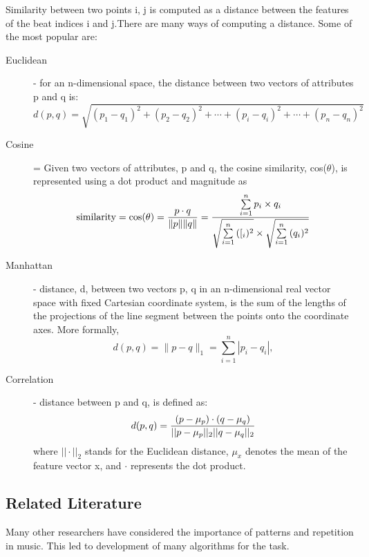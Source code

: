 Similarity between two points i, j is computed as a distance between the features of the beat indices i and j.There are many ways of computing a distance. Some of the most popular are:
\begin{description}
\item[Euclidean] - for an n-dimensional space, the distance between two vectors of attributes p and q is:
\begin{equation}
d(p, q) = \sqrt{(p_1- q_1)^2 + (p_2 - q_2)^2+\cdots+(p_i - q_i)^2+\cdots+(p_n - q_n)^2}
\end{equation}
\item[Cosine] = Given two vectors of attributes, p and q, the cosine similarity, cos($\theta$), is represented using a dot product and magnitude as
\begin{equation}
\text{similarity} = \cos(\theta) = {p \cdot q \over \|p\| \|q\|} = \frac{ \sum\limits_{i=1}^{n}{p_i \times q_i} }{ \sqrt{\sum\limits_{i=1}^{n}{([_i)^2}} \times \sqrt{\sum\limits_{i=1}^{n}{(q_i)^2}} }
\end{equation}
\item[Manhattan] -  distance, d, between two vectors p, q in an n-dimensional real vector space with fixed Cartesian coordinate system, is the sum of the lengths of the projections of the line segment between the points onto the coordinate axes. More formally,
\begin{equation}
d(p, q) = \|p - q\|_1 = \sum_{i=1}^n |p_i-q_i|,
\end{equation}
\item[Correlation] - distance between p and q, is defined as:
\begin{equation}
d(p, q) =  {(p - \mu _{p}) \cdot (q - \mu _{q}) \over ||p -\mu _{p} ||_{2} ||q - \mu _{q}||_{2}}
\end{equation}
where $|| \cdot ||_{2}$ stands for the Euclidean distance, $\mu _{x}$ denotes the mean of the feature vector x, and $\cdot$ represents the dot product.
\end{description}

\vspace{10pt}

\subsection{Related Literature}

Many other researchers have considered the importance of patterns and repetition in music. This led to development of many algorithms for the task.

